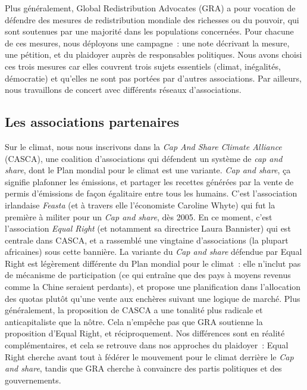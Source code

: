 \documentclass[a5paper,french]{memoir}
\begin{document}
Plus généralement, Global Redistribution Advocates (GRA) a pour vocation de défendre des mesures de redistribution mondiale des richesses ou du pouvoir, qui sont soutenues par une majorité dans les populations concernées. Pour chacune de ces mesures, nous déployons une campagne~: une note décrivant la mesure, une pétition, et du plaidoyer auprès de responsables politiques. Nous avons choisi ces trois mesures car elles couvrent trois sujets essentiels (climat, inégalités, démocratie) et qu'elles ne sont pas portées par d'autres associations. Par ailleurs, nous travaillons de concert avec différents réseaux d'associations. 

\subsection{Les associations partenaires}

Sur le climat, nous nous inscrivons dans la \textit{Cap And Share Climate Alliance} (CASCA), une coalition d'associations qui défendent un système de \textit{cap and share}, dont le Plan mondial pour le climat est une variante. \textit{Cap and share}, ça signifie plafonner les émissions, et partager les recettes générées par la vente de permis d'émissions de façon égalitaire entre tous les humains. C'est l'association irlandaise \textit{Feasta} (et à travers elle l'économiste Caroline Whyte) qui fut la première à militer pour un \textit{Cap and share}, dès 2005. En ce moment, c'est l'association \textit{Equal Right} (et notamment sa directrice Laura Bannister) qui est centrale dans CASCA, et a rassemblé une vingtaine d'associations (la plupart africaines) sous cette bannière. La variante du \textit{Cap and share} défendue par Equal Right est légèrement différente du Plan mondial pour le climat~: elle n'inclut pas de mécanisme de participation (ce qui entraîne que des pays à moyens revenus comme la Chine seraient perdants), et propose une planification dans l'allocation des quotas plutôt qu'une vente aux enchères suivant une logique de marché. Plus généralement, la proposition de CASCA a une tonalité plus radicale et anticapitaliste que la nôtre. Cela n'empêche pas que GRA soutienne la proposition d'Equal Right, et réciproquement. Nos différences sont en réalité complémentaires, et cela se retrouve dans nos approches du plaidoyer~: Equal Right cherche avant tout à fédérer le mouvement pour le climat derrière le \textit{Cap and share}, tandis que GRA cherche à convaincre des partis politiques et des gouvernements. 
\end{document}
